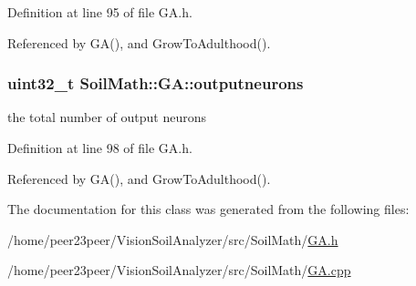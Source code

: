 Definition at line 95 of file G\+A.\+h.



Referenced by G\+A(), and Grow\+To\+Adulthood().

\hypertarget{class_soil_math_1_1_g_a_ab454f9968d5ce2a294b89f85c9d3a74f}{}
\subsubsection[{outputneurons}]{\setlength{\rightskip}{0pt plus 5cm}uint32\+\_\+t Soil\+Math\+::\+G\+A\+::outputneurons\hspace{0.3cm}{\ttfamily [private]}}\label{class_soil_math_1_1_g_a_ab454f9968d5ce2a294b89f85c9d3a74f}
the total number of output neurons 

Definition at line 98 of file G\+A.\+h.



Referenced by G\+A(), and Grow\+To\+Adulthood().



The documentation for this class was generated from the following files\+:\begin{DoxyCompactItemize}
\item 
/home/peer23peer/\+Vision\+Soil\+Analyzer/src/\+Soil\+Math/\hyperlink{_g_a_8h}{G\+A.\+h}\item 
/home/peer23peer/\+Vision\+Soil\+Analyzer/src/\+Soil\+Math/\hyperlink{_g_a_8cpp}{G\+A.\+cpp}\end{DoxyCompactItemize}
